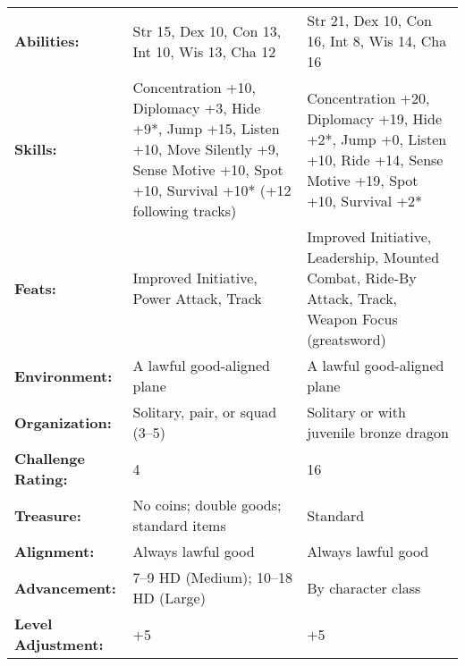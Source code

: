 \documentclass[../main.tex]{subfiles}
\begin{document}
\begin{table*}[H]
\begin{tabular}{p{9em}p{12em}p{16em}}
      \textbf{Abilities:} & Str 15, Dex 10, Con 13, Int 10, Wis 13, Cha 12 & Str 21, Dex 10, Con 16, Int 8, Wis 14, Cha 16 \\
      \rowcolor[HTML]{FFCE93}
      \textbf{Skills:} & Concentration +10, Diplomacy +3, Hide +9*, Jump +15, Listen +10, Move Silently +9, Sense Motive +10, Spot +10, Survival +10* (+12 following tracks) & Concentration +20, Diplomacy +19, Hide +2*, Jump +0, Listen +10, Ride +14, Sense Motive +19, Spot +10, Survival +2* \\
      \textbf{Feats:} & Improved Initiative, Power Attack, Track & Improved Initiative, Leadership, Mounted Combat, Ride-By Attack, Track, Weapon Focus (greatsword)  \\
      \rowcolor[HTML]{FFCE93}
      \textbf{Environment:} & A lawful good-aligned plane & A lawful good-aligned plane \\
      \textbf{Organization:} & Solitary, pair, or squad (3–5) & Solitary or with juvenile bronze dragon \\
      \rowcolor[HTML]{FFCE93}
      \textbf{Challenge Rating:} & 4 & 16 \\
      \textbf{Treasure:} & No coins; double goods; standard items & Standard \\
      \rowcolor[HTML]{FFCE93}
      \textbf{Alignment:} & Always lawful good & Always lawful good \\
      \textbf{Advancement:} & 7–9 HD (Medium); 10–18 HD (Large) & By character class \\
      \rowcolor[HTML]{FFCE93}
      \textbf{Level Adjustment:} & +5 & +5 \\
    \end{tabular}
  \end{table*}

  \\
  \\
  \\
  \\
  \\
\end{document}
